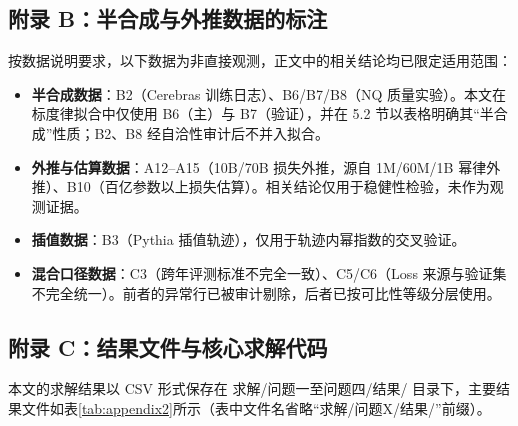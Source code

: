 \subsection*{附录 B：半合成与外推数据的标注}

按数据说明要求，以下数据为非直接观测，正文中的相关结论均已限定适用范围：

\begin{itemize}[itemindent=2em]
\item \textbf{半合成数据}：B2（Cerebras 训练日志）、B6/B7/B8（NQ 质量实验）。本文在标度律拟合中仅使用 B6（主）与 B7（验证），并在 5.2 节以表格明确其“半合成”性质；B2、B8 经自洽性审计后不并入拟合。
\item \textbf{外推与估算数据}：A12--A15（10B/70B 损失外推，源自 1M/60M/1B 幂律外推）、B10（百亿参数以上损失估算）。相关结论仅用于稳健性检验，未作为观测证据。
\item \textbf{插值数据}：B3（Pythia 插值轨迹），仅用于轨迹内幂指数的交叉验证。
\item \textbf{混合口径数据}：C3（跨年评测标准不完全一致）、C5/C6（Loss 来源与验证集不完全统一）。前者的异常行已被审计剔除，后者已按可比性等级分层使用。
\end{itemize}

\subsection*{附录 C：结果文件与核心求解代码}

本文的求解结果以 CSV 形式保存在 求解/问题一至问题四/结果/ 目录下，主要结果文件如表\ref{tab:appendix2}所示（表中文件名省略“求解/问题X/结果/”前缀）。

